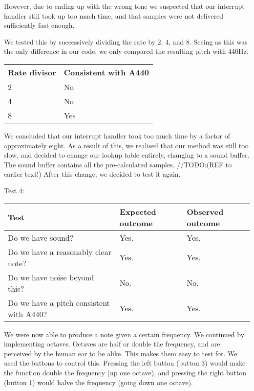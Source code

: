 However, due to ending up with the wrong tone we suspected that our interrupt handler still took up too much
time, and that samples were not delivered sufficiently fast enough.

We tested this by successively dividing the rate by 2, 4, and 8. Seeing as this was the only difference in our code, we only compared the resulting pitch with 440Hz.
\begin{center}
\begin{tabular}{|l|l|}
\hline
{\sc Rate divisor} & {\sc Consistent with A440} \\ \hline
2 & No \\ \hline
4 & No \\ \hline
8 & Yes \\ \hline
\end{tabular}
\end{center}

We concluded that our interrupt handler took too much time by a factor
of approximately eight. As a result of this, we realised that our method
was still too slow, and decided to change our lookup table entirely,
changing to a sound buffer. The sound buffer contains all the
pre-calculated samples. //TODO:(REF to earlier text!) After this change,
we decided to test it again.

Test 4:
\begin{center}
\begin{tabular}{|p{3.6cm}|p{3.6cm}|p{3.6cm}|}
\hline
{\sc Test} & {\sc Expected outcome} & {\sc Observed outcome}\\ \hline
Do we have sound? & Yes. & Yes. \\ \hline
Do we have a reasonably clear note? & Yes. & Yes. \\ \hline
Do we have noise beyond this? & No. & No. \\ \hline
Do we have a pitch consistent with A440? & Yes. & Yes. \\ \hline
\end{tabular}
\end{center}

We were now able to produce a note given a certain frequency. We
continued by implementing octaves. Octaves are half or double the
frequency, and are perceived by the human ear to be alike. This makes
them easy to test for. We used the buttons to control this. Pressing the
left button (button 3) would make the function double the frequency (up
one octave), and pressing the right button (button 1) would halve the
frequency (going down one octave).

